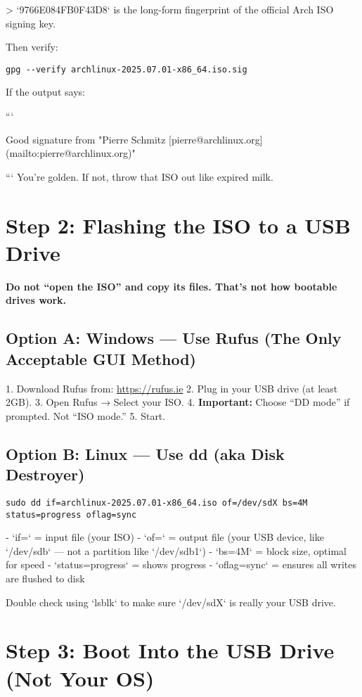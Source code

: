 \documentclass[12pt,openany]{book}
\begin{document}
> `9766E084FB0F43D8` is the long-form fingerprint of the official Arch ISO signing key.

Then verify:
\begin{lstlisting}
gpg --verify archlinux-2025.07.01-x86_64.iso.sig
\end{lstlisting}

If the output says:

```

Good signature from "Pierre Schmitz [pierre@archlinux.org](mailto:pierre@archlinux.org)"

```
You're golden. If not, throw that ISO out like expired milk.

\section*{Step 2: Flashing the ISO to a USB Drive}

\textbf{Do not “open the ISO” and copy its files. That’s not how bootable drives work.}

\subsection*{Option A: Windows — Use Rufus (The Only Acceptable GUI Method)}

1. Download Rufus from: \url{https://rufus.ie}
2. Plug in your USB drive (at least 2GB).
3. Open Rufus → Select your ISO.
4. \textbf{Important:} Choose “DD mode” if prompted. Not “ISO mode.”
5. Start.

\subsection*{Option B: Linux — Use dd (aka Disk Destroyer)}

\begin{lstlisting}
sudo dd if=archlinux-2025.07.01-x86_64.iso of=/dev/sdX bs=4M status=progress oflag=sync
\end{lstlisting}

- `if=` = input file (your ISO)
- `of=` = output file (your USB device, like `/dev/sdb` — not a partition like `/dev/sdb1`)
- `bs=4M` = block size, optimal for speed
- `status=progress` = shows progress
- `oflag=sync` = ensures all writes are flushed to disk

Double check using `lsblk` to make sure `/dev/sdX` is really your USB drive.

\section*{Step 3: Boot Into the USB Drive (Not Your OS)}
\end{document}
